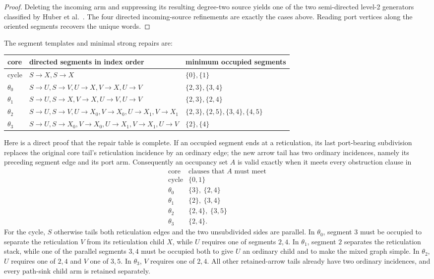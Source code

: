 \documentclass[11pt]{article}
\theoremstyle{remark}
\newcommand{\1}{\mathbf 1}
\begin{document}
\begin{proof}
Deleting the incoming arm and suppressing its resulting degree-two source
yields one of the two semi-directed level-2 generators classified by Huber et
al.~\cite[Lemma~4.2 and Figure~8]{HuberEtAl2025}.  The four directed
incoming-source refinements are exactly the cases above.
Reading port vertices along the oriented segments recovers the unique words.
\end{proof}

The segment templates and minimal strong repairs are:
\begin{center}
\small
\begin{tabular}{lll}
\toprule
core & directed segments in index order & minimum occupied segments\\
\midrule
cycle & \(S\!\to X,S\!\to X\) & \(\{0\},\{1\}\)\\
\(\theta_0\) & \(S\!\to U,S\!\to V,U\!\to X,V\!\to X,U\!\to V\)
 & \(\{2,3\},\{3,4\}\)\\
\(\theta_1\) & \(S\!\to U,S\!\to X,V\!\to X,U\!\to V,U\!\to V\)
 & \(\{2,3\},\{2,4\}\)\\
\(\theta_2\) & \(S\!\to U,S\!\to V,U\!\to X_0,V\!\to X_0,
 U\!\to X_1,V\!\to X_1\)
 & \(\{2,3\},\{2,5\},\{3,4\},\{4,5\}\)\\
\(\theta_3\) & \(S\!\to U,S\!\to X_0,V\!\to X_0,U\!\to X_1,
 V\!\to X_1,U\!\to V\)
 & \(\{2\},\{4\}\)\\
\bottomrule
\end{tabular}
\end{center}
Here is a direct proof that the repair table is complete.  If an occupied
segment ends at a reticulation, its last port-bearing subdivision replaces
the original core tail's reticulation incidence by an ordinary edge; the new
arrow tail has two ordinary incidences, namely its preceding segment edge and
its port arm.
Consequently an occupancy set \(A\) is valid exactly when it meets every
obstruction clause in
\[
\begin{array}{c|l}
\text{core} & \text{clauses that \(A\) must meet}\\
\hline
\text{cycle} & \{0,1\}\\
\theta_0 & \{3\},\ \{2,4\}\\
\theta_1 & \{2\},\ \{3,4\}\\
\theta_2 & \{2,4\},\ \{3,5\}\\
\theta_3 & \{2,4\}.
\end{array}
\]
For the cycle, \(S\) otherwise tails both reticulation edges and the two
unsubdivided sides are parallel.  In \(\theta_0\), segment \(3\) must be
occupied to separate the reticulation \(V\) from its reticulation child
\(X\), while \(U\) requires one of segments \(2,4\).  In \(\theta_1\),
segment \(2\) separates the reticulation stack, while one of the parallel
segments \(3,4\) must be occupied both to give \(U\) an ordinary child and
to make the mixed graph simple.  In \(\theta_2\), \(U\) requires one of
\(2,4\) and \(V\) one of \(3,5\).  In \(\theta_3\), \(V\) requires one of
\(2,4\).  All other retained-arrow tails already have two ordinary
incidences, and every path-sink child arm is retained separately.
\end{document}
